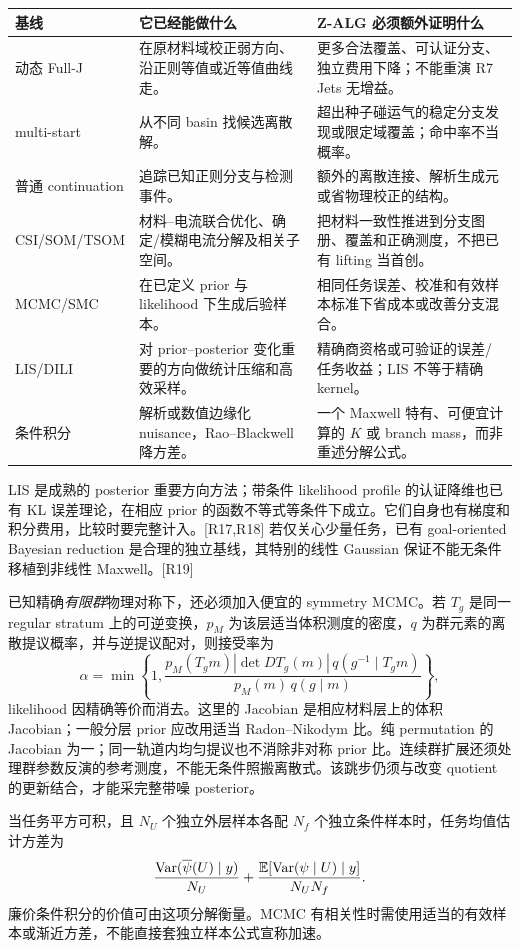 \begin{longtable}{p{}p{}p{}}
\toprule 基线 & 它已经能做什么 & Z-ALG 必须额外证明什么\\\midrule\endhead
动态 Full-J & 在原材料域校正弱方向、沿正则等值或近等值曲线走。 & 更多合法覆盖、可认证分支、独立费用下降；不能重演 R7 Jets 无增益。\\
multi-start & 从不同 basin 找候选离散解。 & 超出种子碰运气的稳定分支发现或限定域覆盖；命中率不当概率。\\
普通 continuation & 追踪已知正则分支与检测事件。 & 额外的离散连接、解析生成元或省物理校正的结构。\\
CSI/SOM/TSOM & 材料--电流联合优化、确定/模糊电流分解及相关子空间。 & 把材料一致性推进到分支图册、覆盖和正确测度，不把已有 lifting 当首创。\\
MCMC/SMC & 在已定义 prior 与 likelihood 下生成后验样本。 & 相同任务误差、校准和有效样本标准下省成本或改善分支混合。\\
LIS/DILI & 对 prior--posterior 变化重要的方向做统计压缩和高效采样。 & 精确商资格或可验证的误差/任务收益；LIS 不等于精确 kernel。\\
条件积分 & 解析或数值边缘化 nuisance，Rao--Blackwell 降方差。 & 一个 Maxwell 特有、可便宜计算的 $K$ 或 branch mass，而非重述分解公式。\\\bottomrule
\end{longtable}

LIS 是成熟的 posterior 重要方向方法；带条件 likelihood profile 的认证降维也已有 KL 误差理论，在相应 prior 的函数不等式等条件下成立。它们自身也有梯度和积分费用，比较时要完整计入。[R17,R18] 若仅关心少量任务，已有 goal-oriented Bayesian reduction 是合理的独立基线，其特别的线性 Gaussian 保证不能无条件移植到非线性 Maxwell。[R19]

已知精确\emph{有限群}物理对称下，还必须加入便宜的 symmetry MCMC。若 $T_g$ 是同一 regular stratum 上的可逆变换，$p_M$ 为该层适当体积测度的密度，$q$ 为群元素的离散提议概率，并与逆提议配对，则接受率为
\begin{equation}
\alpha=\min\left\{1,
\frac{p_M(T_gm)|\det DT_g(m)|\,q(g^{-1}\mid T_gm)}
{p_M(m)\,q(g\mid m)}\right\},
\end{equation}
likelihood 因精确等价而消去。这里的 Jacobian 是相应材料层上的体积 Jacobian；一般分层 prior 应改用适当 Radon--Nikodym 比。纯 permutation 的 Jacobian 为一；同一轨道内均匀提议也不消除非对称 prior 比。连续群扩展还须处理群参数反演的参考测度，不能无条件照搬离散式。该跳步仍须与改变 quotient 的更新结合，才能采完整带噪 posterior。

当任务平方可积，且 $N_U$ 个独立外层样本各配 $N_f$ 个独立条件样本时，任务均值估计方差为
\begin{equation}
\frac{\operatorname{Var}(\overline\psi(U)\mid y)}{N_U}
+\frac{\mathbb E[\operatorname{Var}(\psi\mid U)\mid y]}{N_UN_f}.
\end{equation}
廉价条件积分的价值可由这项分解衡量。MCMC 有相关性时需使用适当的有效样本或渐近方差，不能直接套独立样本公式宣称加速。
